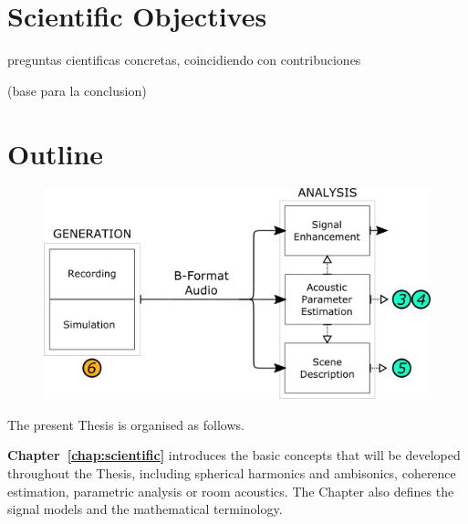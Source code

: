 \section{Scientific Objectives}

preguntas cientificas concretas, coincidiendo con contribuciones

(base para la conclusion)

%


\section{Outline}

\begin{figure}[t]
  \includegraphics[width=\textwidth]{Figures/Introduction/SCHEME1_NUMBERS.png}
  \caption{}
  \label{fig:scheme1_numbers}
\end{figure}

The present Thesis is organised as follows. 

\textbf{Chapter~\ref{chap:scientific}} introduces the basic concepts that will be developed throughout the Thesis, including spherical harmonics and ambisonics, coherence estimation, parametric analysis or room acoustics. The Chapter also defines the signal models and the mathematical terminology.



